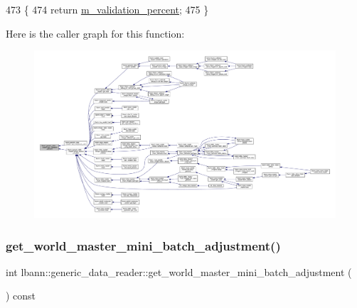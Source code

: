 \begin{DoxyCode}
473                                                          \{
474   \textcolor{keywordflow}{return} \hyperlink{classlbann_1_1generic__data__reader_a3e4afbe28634a913f6de9daabf05dc0d}{m\_validation\_percent};
475 \}
\end{DoxyCode}
Here is the caller graph for this function\+:\nopagebreak
\begin{figure}[H]
\begin{center}
\leavevmode
\includegraphics[width=350pt]{classlbann_1_1generic__data__reader_ab06058b5fa1d74239998358b02f73132_icgraph}
\end{center}
\end{figure}
\mbox{\label{classlbann_1_1generic__data__reader_a0d0f7d684970b5cc59c63050555df302}} 
\subsubsection{\texorpdfstring{get\+\_\+world\+\_\+master\+\_\+mini\+\_\+batch\+\_\+adjustment()}{get\_world\_master\_mini\_batch\_adjustment()}}
{\footnotesize\ttfamily int lbann\+::generic\+\_\+data\+\_\+reader\+::get\+\_\+world\+\_\+master\+\_\+mini\+\_\+batch\+\_\+adjustment (\begin{DoxyParamCaption}{ }\end{DoxyParamCaption}) const\hspace{0.3cm}{\ttfamily [inline]}}




